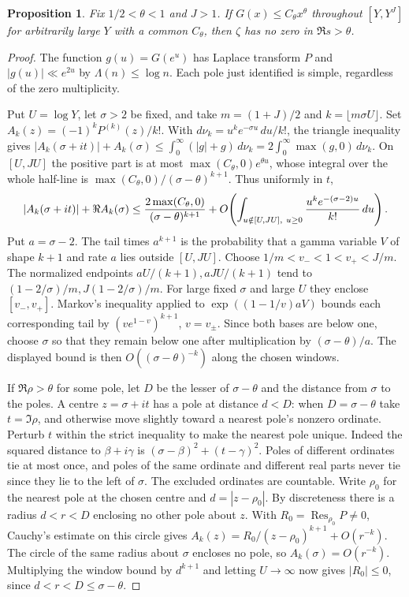 \documentclass[10pt]{amsart}
\newtheorem{proposition}[theorem]{Proposition}
\theoremstyle{definition}
\theoremstyle{remark}
\begin{document}
\begin{proposition}\label{prop:growing-window}
Fix $1/2<\theta<1$ and $J>1$. If $G(x)\le C_\theta x^\theta$
throughout $[Y,Y^J]$ for arbitrarily large $Y$ with a common
$C_\theta$, then $\zeta$ has no zero in $\Re s>\theta$.
\end{proposition}
\begin{proof}
The function $g(u)=G(e^u)$ has Laplace transform $P$ and $|g(u)|\ll e^{2u}$
by $\Lambda(n)\le\log n$. Each pole just identified is simple, regardless of the zero multiplicity.

Put $U=\log Y$, let $\sigma>2$ be fixed, and take
$m=(1+J)/2$ and $k=\lfloor m\sigma U\rfloor$. Set $A_k(z)=(-1)^kP^{(k)}(z)/k!$.
With $d\nu_k=u^k e^{-\sigma u}\,du/k!$, the triangle inequality gives
$|A_k(\sigma+it)|+A_k(\sigma)\le
\int_0^\infty(|g|+g)\,d\nu_k=2\int_0^\infty\max(g,0)\,d\nu_k$.
On $[U,JU]$ the positive part is at most
$\max(C_\theta,0)e^{\theta u}$, whose integral over the whole half-line
is $\max(C_\theta,0)/(\sigma-\theta)^{k+1}$. Thus uniformly in $t$,
\[
 |A_k(\sigma+it)|+\Re A_k(\sigma)
 \le {2\max(C_\theta,0)\over(\sigma-\theta)^{k+1}}
 +O\!\left(\int_{u\notin[U,JU],\ u\ge0}
          {u^k e^{-(\sigma-2)u}\over k!}\,du\right).
\]
Put $a=\sigma-2$. The tail times $a^{k+1}$ is the probability that
a gamma variable $V$ of shape $k+1$ and rate $a$ lies outside
$[U,JU]$. Choose $1/m<v_-<1<v_+<J/m$. The normalized endpoints
$aU/(k+1),aJU/(k+1)$ tend to $(1-2/\sigma)/m,J(1-2/\sigma)/m$.
For large fixed $\sigma$ and large $U$ they enclose $[v_-,v_+]$.
Markov's inequality applied to $\exp((1-1/v)aV)$ bounds each
corresponding tail by $(ve^{1-v})^{k+1}$, $v=v_\pm$. Since both
bases are below one, choose $\sigma$ so that they remain below one
after multiplication by $(\sigma-\theta)/a$. The displayed bound is
then $O((\sigma-\theta)^{-k})$ along the chosen windows.

If $\Re\rho>\theta$ for some pole, let $D$ be the lesser of
$\sigma-\theta$ and the distance from $\sigma$ to the poles.
A centre $z=\sigma+it$ has a pole at distance $d<D$: when
$D=\sigma-\theta$ take $t=\Im\rho$, and otherwise move slightly
toward a nearest pole's nonzero ordinate. Perturb $t$ within the
strict inequality to make the nearest pole unique. Indeed the
squared distance to $\beta+i\gamma$ is
$(\sigma-\beta)^2+(t-\gamma)^2$. Poles of different ordinates
tie at most once, and poles of the same ordinate and different real
parts never tie since they lie to the left of $\sigma$. The excluded
ordinates are countable. Write $\rho_0$ for the nearest pole at the
chosen centre and $d=|z-\rho_0|$. By discreteness there is a radius
$d<r<D$ enclosing no other pole about $z$. With
$R_0=\operatorname{Res}_{\rho_0}P\ne0$, Cauchy's estimate on this
circle gives $A_k(z)=R_0/(z-\rho_0)^{k+1}+O(r^{-k})$.
The circle of the same radius about $\sigma$ encloses no pole,
so $A_k(\sigma)=O(r^{-k})$. Multiplying the window bound by
$d^{k+1}$ and letting $U\to\infty$ now gives $|R_0|\le0$,
since $d<r<D\le\sigma-\theta$.
\end{proof}
\end{document}
